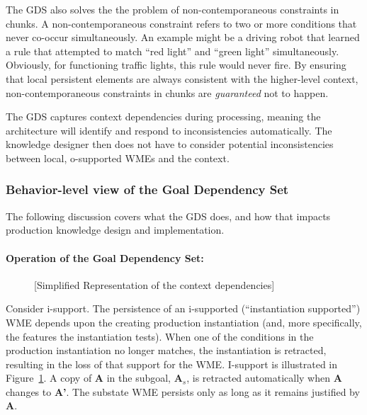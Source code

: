 The GDS also solves the the problem of non-contemporaneous constraints in chunks. A non-contemporaneous constraint refers to two or more conditions that never co-occur simultaneously. An example might be a driving robot that learned a rule that attempted to match ``red light'' and ``green light'' simultaneously. Obviously, for functioning traffic lights, this rule would never fire. By ensuring that local persistent elements are always consistent with the higher-level context, non-contemporaneous constraints in chunks are \emph{guaranteed} not to happen.

The GDS captures context dependencies during processing, meaning the architecture will identify and respond to inconsistencies automatically.  The knowledge designer then does not have to consider potential inconsistencies between local, o-supported WMEs and the context.


\subsubsection{Behavior-level view of the Goal Dependency Set}

The following discussion covers what the GDS does, and how that impacts production knowledge design and implementation.

\paragraph{Operation of the Goal Dependency Set:}

\begin{figure}
	[Simplified Representation of the context dependencies]
	\label{'ncc'}
\end{figure}

Consider i-support. The persistence of an i-supported (``instantiation supported'') WME depends upon the creating production instantiation (and, more specifically, the features the instantiation tests). When one of the conditions in the production instantiation no longer matches, the instantiation is retracted, resulting in the loss of that support for the WME. I-support is illustrated in Figure~\ref{'ncc'}. A copy of {\bf A} in the subgoal, {\bf A$_s$}, is retracted automatically when {\bf A} changes to {\bf A'}. The substate WME persists only as long as it remains justified by {\bf A}.

